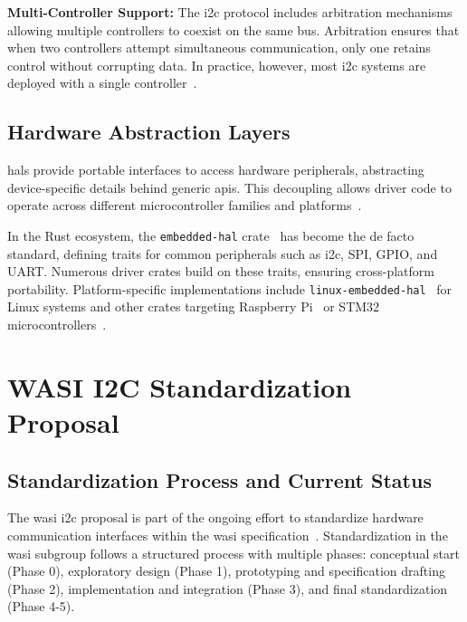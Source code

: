 \textbf{Multi-Controller Support:} The \acrshort{i2c} protocol includes arbitration mechanisms allowing multiple controllers to coexist on the same bus. Arbitration ensures that when two controllers attempt simultaneous communication, only one retains control without corrupting data. In practice, however, most \acrshort{i2c} systems are deployed with a single controller~\cite{i2c_specification}.

\subsection{Hardware Abstraction Layers}
\label{subsec:hal-embedded}

\acrfull{hal}s provide portable interfaces to access hardware peripherals, abstracting device-specific details behind generic \acrshort{api}s. This decoupling allows driver code to operate across different microcontroller families and platforms~\cite{hal}.  

In the Rust ecosystem, the \texttt{embedded-hal} crate~\cite{embedded_hal_crate} has become the de facto standard, defining traits for common peripherals such as \acrshort{i2c}, SPI, GPIO, and UART. Numerous driver crates build on these traits, ensuring cross-platform portability. Platform-specific implementations include \texttt{linux-embedded-hal}~\cite{linux_embedded_hal_crate} for Linux systems and other crates targeting Raspberry Pi~\cite{rppal_crate} or STM32 microcontrollers~\cite{stm_hal_crate}.

\section{WASI I2C Standardization Proposal}
\label{sec:wasi-i2c-proposal}

\subsection{Standardization Process and Current Status}
\label{subsec:i2c-standardization-process}

The \acrshort{wasi} \acrshort{i2c} proposal is part of the ongoing effort to standardize hardware communication interfaces within the \acrshort{wasi} specification~\cite{wasi_i2c_proposal}. Standardization in the \acrshort{wasi} subgroup follows a structured process with multiple phases: conceptual start (Phase 0), exploratory design (Phase 1), prototyping and specification drafting (Phase 2), implementation and integration (Phase 3), and final standardization (Phase 4-5).  

